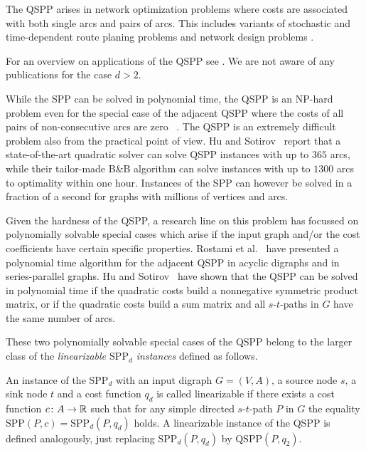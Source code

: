 \smallskip

The QSPP arises 
in network optimization  problems where costs are associated with both single arcs and pairs of arcs.
This includes 
variants of stochastic and time-dependent route planing  problems  
\cite{nie2009reliable,sen2001mean,sivakumar1994variance}
and network design problems 
\cite{murakami1997restoration,gamvros2006satellite}. 

For an overview on applications of the QSPP see \cite{huSo2020,rostami2018}.
We are not  aware of any
publications  
for the case $d>2$.


While the SPP can be solved in polynomial time, the QSPP is an NP-hard
problem even for the special case of the adjacent QSPP where  the  costs of all pairs of non-consecutive  arcs are  
zero ~\cite{rostami2018}.
The QSPP is  an  extremely difficult
problem also from the practical point of view.  
 Hu and Sotirov~\cite{huSo2020} report that a state-of-the-art quadratic solver can
solve QSPP instances with up to $365$ arcs, while their  tailor-made B\&B
algorithm can solve instances with up to $1300$ arcs to optimality within one  hour. 
Instances of the SPP can however be solved in a fraction of a second for graphs with
millions of vertices and arcs.

\smallskip

Given the 
hardness of the QSPP, a research line on this problem has focussed
on 
polynomially solvable special cases which
arise if the input graph and/or the cost coefficients have certain specific
properties. Rostami et al.~\cite{rostami2015} have presented a polynomial time
algorithm for the adjacent QSPP in acyclic digraphs and in series-parallel graphs. Hu 
and Sotirov~\cite{huSo2018}
have shown that the QSPP can be solved in polynomial time if the  quadratic
costs build a  nonnegative symmetric product matrix, or if the quadratic costs
build a sum matrix and all $s$-$t$-paths in 
$G$ have the same number of arcs. 
\smallskip

These two polynomially solvable
special cases of the QSPP belong to the larger class of the \emph{linearizable $\text{SPP}_d$ instances} defined as follows.
\begin{definition}
\label{def:linearizable}
 An instance of the SPP$_d$ with an input digraph $G=(V,A)$, a source node $s$, a sink node $t$
 and a  cost function $q_d$ is called linearizable if there exists a cost function
 $c\colon A\to \mathbb{R}$ such that for any simple directed $s$-$t$-path  $P$ in $G$ the equality
 $\text{SPP}(P,c) = \text{SPP}_d(P,q_d)$ holds.
  A linearizable instance  of the  QSPP is defined analogously, just  replacing $\text{SPP}_d(P,q_d)$ by $\text{QSPP}(P,q_2)$.
\end{definition}

